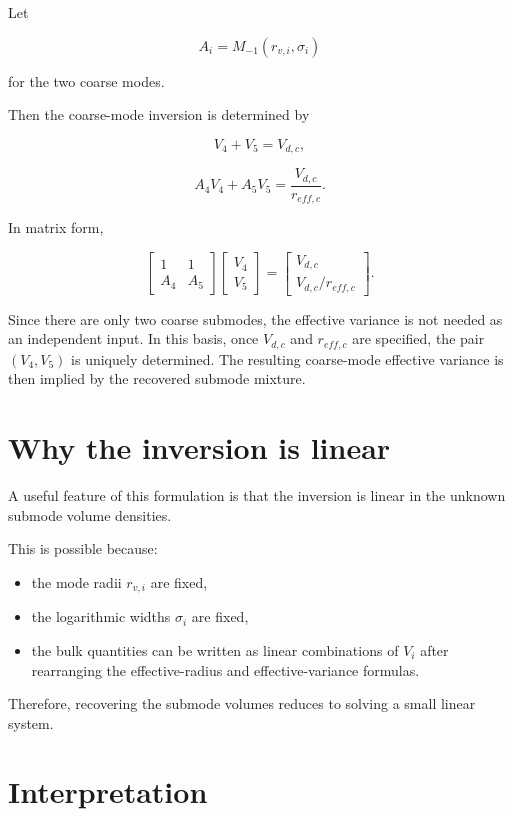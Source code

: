 \documentclass[
  11pt,
  letterpaper,
]{scrreprt}
\providecommand{\tightlist}{%
  \setlength{\itemsep}{0pt}\setlength{\parskip}{0pt}}
\begin{document}
Let

\[
A_i = M_{-1}(r_{v,i},\sigma_i)
\]

for the two coarse modes.

Then the coarse-mode inversion is determined by

\[
V_4 + V_5 = V_{d,c},
\]

\[
A_4V_4 + A_5V_5 = \frac{V_{d,c}}{r_{eff,c}}.
\]

In matrix form,

\[
\begin{bmatrix}
1 & 1 \\
A_4 & A_5
\end{bmatrix}
\begin{bmatrix}
V_4 \\ V_5
\end{bmatrix}
=
\begin{bmatrix}
V_{d,c} \\
V_{d,c}/r_{eff,c}
\end{bmatrix}.
\]

Since there are only two coarse submodes, the effective variance is not
needed as an independent input. In this basis, once \(V_{d,c}\) and
\(r_{eff,c}\) are specified, the pair \((V_4,V_5)\) is uniquely
determined. The resulting coarse-mode effective variance is then implied
by the recovered submode mixture.

\section{Why the inversion is linear}\label{why-the-inversion-is-linear}

A useful feature of this formulation is that the inversion is linear in
the unknown submode volume densities.

This is possible because:

\begin{itemize}
\tightlist
\item
  the mode radii \(r_{v,i}\) are fixed,
\item
  the logarithmic widths \(\sigma_i\) are fixed,
\item
  the bulk quantities can be written as linear combinations of \(V_i\)
  after rearranging the effective-radius and effective-variance
  formulas.
\end{itemize}

Therefore, recovering the submode volumes reduces to solving a small
linear system.

\section{Interpretation}\label{interpretation}
\end{document}
